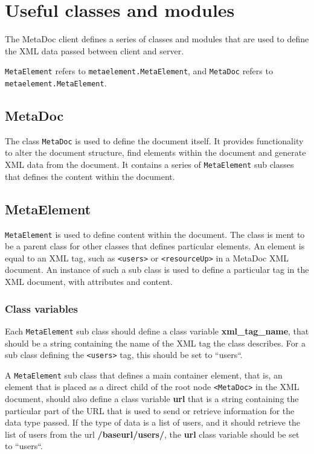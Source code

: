 \newpage
\section{Useful classes and modules}
\label{sec:useful_classes}
The MetaDoc client defines a series of classes and modules that are used to
define the XML data passed between client and server. 

\texttt{MetaElement} refers to \texttt{metaelement.MetaElement}, and
\texttt{MetaDoc} refers to \\ \texttt{metaelement.MetaElement}.

\subsection{MetaDoc}
The class \texttt{MetaDoc} is used to define the document itself. It provides
functionality to alter the document structure, find elements within the
document and generate XML data from the document. It contains a series of
\texttt{MetaElement} sub classes that defines the content within the document.

\subsection{MetaElement}
\texttt{MetaElement} is used to define content within the document.  The class
is ment to be a parent class for other classes that defines particular
elements. An element is equal to an XML tag, such as \texttt{<users>} or
\texttt{<resourceUp>} in a MetaDoc XML document. An instance of such a sub
class is used to define a particular tag in the XML document, with attributes
and content.  

\subsubsection{Class variables}

Each \texttt{MetaElement} sub class should define a class variable
\textbf{xml\_tag\_name}, that should be a string containing the name of the XML
tag the class describes. For a sub class defining the \texttt{<users>} tag,
this should be set to ``users``. 

A \texttt{MetaElement} sub class that defines a main container element, that
is, an element that is placed as a direct child of the root node
\texttt{<MetaDoc>} in the XML document, should also define a class variable
\textbf{url} that is a string containing the particular part of the URL that is
used to send or retrieve information for the data type passed. If the type of
data is a list of users, and it should retrieve the list of users from the url
\textbf{/baseurl/users/}, the \textbf{url} class variable should be set to
``users``.

